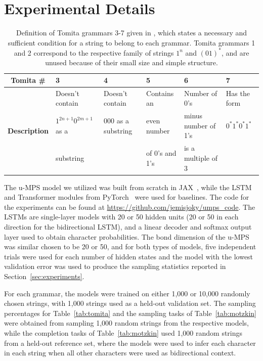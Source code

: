 \section{Experimental Details}
\label{sec:appendix_d}

\begin{table}[h]
\caption{Definition of Tomita grammars 3-7 given in \citep{bengio1994}, which states a necessary and sufficient condition for a string to belong to each grammar. Tomita grammars 1 and 2 correspond to the respective family of strings $1^n$ and $(01)^*$, and are unused because of their small size and simple structure.}
\label{tab:tomita_def}
\begin{center}
\begin{small}
\begin{tabular}{c|lllll}
    \textbf{Tomita \#} & 3 & 4 & 5 & 6 & 7 \\
    \midrule
    \multirow{3}{*}{\textbf{Description}} & Doesn't contain         & Doesn't contain      & Contains an    & Number of 0's       & Has the form \\
                                          & $1^{2n+1}0^{2m+1}$ as a & $000$ as a substring & even number    & minus number of 1's & $0^*1^*0^*1^*$ \\
                                          & substring               &                      & of 0's and 1's & is a multiple of 3  & 
\end{tabular}
\end{small}
\end{center}
\end{table}

The u-MPS model we utilized was built from scratch in JAX~\citep{jax2018}, while the LSTM and Transformer modules from PyTorch~\citep{paszke2017} were used for baselines. The code for the experiments can be found at \url{https://github.com/jemisjoky/umps_code}. 
The LSTMs are single-layer models with 20 or 50 hidden units (20 or 50 in each direction for the bidirectional LSTM), and a linear decoder and softmax output layer used to obtain character probabilities. The bond dimension of the u-MPS was similar chosen to be 20 or 50, and for both types of models, five independent trials were used for each number of hidden states and the model with the lowest validation error was used to produce the sampling statistics reported in Section~\ref{sec:experiments}. 

For each grammar, the models were trained on either 1,000 or 10,000 randomly chosen strings, with 1,000 strings used as a held-out validation set. The sampling percentages for Table~\ref{tab:tomita} 
and the sampling tasks of Table~\ref{tab:motzkin} 
were obtained from sampling 1,000 random strings from the respective models, while the completion tasks of Table~\ref{tab:motzkin} 
used 1,000 random strings from a held-out reference set, where the models were used to infer each character in each string when all other characters were used as bidirectional context.

